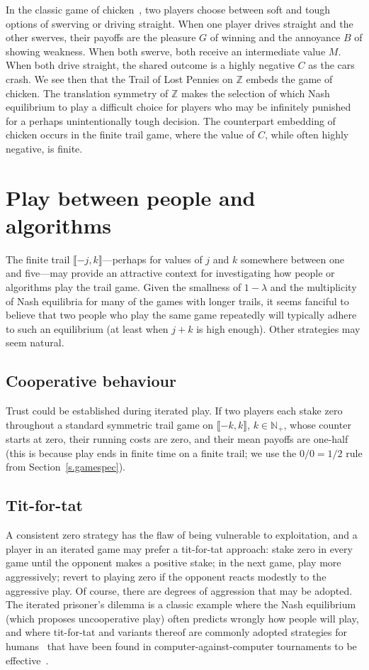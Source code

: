 \documentclass[letterpaper,11pt,oneside,reqno]{amsbook}
\newcommand{\N}{\ensuremath{\mathbb{N}}}
\newcommand{\Z}{\ensuremath{\mathbb{Z}}}
\numberwithin{figure}{chapter}
\theoremstyle{definition}
\theoremstyle{definition}
\theoremstyle{definition}
\theoremstyle{definition}
\theoremstyle{definition}
\newcommand{\nwithoutzero}{\N_+}
\begin{document}
In the classic game of chicken~\cite[Chapter~$10$]{Poundstone2011}, two players choose between soft and tough options of swerving or driving straight. When one player drives straight and the other swerves, their payoffs are the pleasure $G$ of winning  and the annoyance $B$ of showing weakness. When both swerve, both receive an intermediate value $M$. When both drive straight, the shared outcome is a highly negative $C$ as the cars crash. We see then that the Trail of Lost Pennies on $\Z$ embeds the game of chicken. The translation symmetry of $\Z$ makes the selection of which Nash equilibrium to play a difficult choice for players who may be infinitely punished for a perhaps unintentionally tough decision. The counterpart embedding of chicken occurs in the finite trail game, where the value of $C$, while often highly negative, is finite.

\section{Play between people and algorithms}

The finite trail $\llbracket -j,k \rrbracket$---perhaps for values of $j$ and $k$ somewhere between one and five---may provide an attractive context for investigating how people or algorithms play the trail game. Given the smallness of $1 - \lambda$ and the multiplicity of Nash equilibria for many of the games with longer trails, it seems fanciful to believe that two people who play the same game repeatedly will typically adhere to such an equilibrium (at least when $j +k$ is high enough). Other strategies may seem natural.

\subsection{Cooperative behaviour}
Trust could be established during iterated play. If two players each stake zero throughout a standard symmetric  trail game on $\llbracket -k,k \rrbracket$, $k \in \nwithoutzero$, whose counter starts at zero, their running costs are zero, and their mean payoffs are one-half (this is because play ends in finite time on a finite trail; we use the $0/0 =1/2$ rule from Section~\ref{s.gamespec}). 
\subsection{Tit-for-tat}
A consistent zero strategy has the flaw of being vulnerable to exploitation, and a player in an iterated game may prefer a tit-for-tat approach: stake zero in every game until the opponent makes a positive stake; in the next game, play more aggressively; revert to playing zero if the opponent reacts modestly to the aggressive play. Of course, there are degrees of aggression that may be adopted. The iterated prisoner's dilemma is a classic example where the Nash equilibrium (which proposes uncooperative play) often predicts wrongly how people will play, and where tit-for-tat and variants thereof are commonly adopted strategies for humans~\cite{DalBoFrechette} that have been found in computer-against-computer tournaments to be effective~\cite{AxelrodHamilton}.
\end{document}
